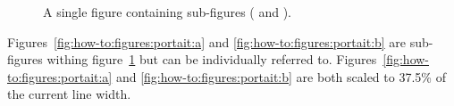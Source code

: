 \begin{figure}
  \centering
  \caption[A single portrait figure]{A single figure containing sub-figures
    (\protect{} and
    \protect{})\@.}
  \label{fig:how-to:figures:portait}
\end{figure}
Figures~\ref{fig:how-to:figures:portait:a} and \ref{fig:how-to:figures:portait:b} are sub-figures
withing figure~\ref{fig:how-to:figures:portait} but can be individually referred
to. Figures~\ref{fig:how-to:figures:portait:a} and \ref{fig:how-to:figures:portait:b} are both
scaled to 37.5\% of the current line width.
\par

